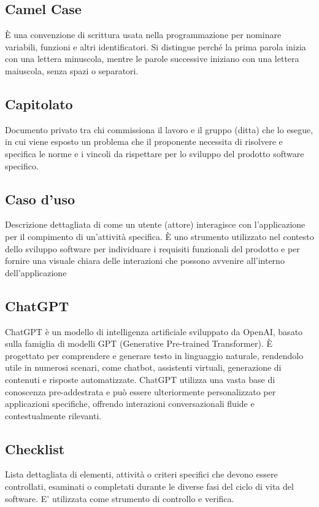 \subsection*{Camel Case}
È una convenzione di scrittura usata nella programmazione per nominare variabili, funzioni e altri identificatori. 
Si distingue perché la prima parola inizia con una lettera minuscola, mentre le parole successive iniziano con una lettera maiuscola, senza spazi o separatori.

\hypertarget{sec:capitolato}{}
\subsection*{Capitolato}
Documento privato tra chi commissiona il lavoro e il gruppo (ditta) che lo esegue, in cui viene esposto un problema che il proponente necessita di risolvere 
e specifica le norme e i vincoli da rispettare per lo sviluppo del prodotto software specifico.

\hypertarget{sec:caso_uso}{}
\subsection*{Caso d'uso}
Descrizione dettagliata di come un utente (attore) interagisce con l'applicazione per il compimento di un'attività specifica. È uno strumento utilizzato nel 
contesto dello sviluppo software per individuare i requisiti funzionali del prodotto e per fornire una visuale chiara delle interazioni che possono avvenire 
all'interno dell'applicazione

\hypertarget{sec:chatgpt}{}
\subsection*{ChatGPT}
ChatGPT è un modello di intelligenza artificiale sviluppato da OpenAI, basato sulla famiglia di modelli GPT (Generative Pre-trained Transformer). 
È progettato per comprendere e generare testo in linguaggio naturale, rendendolo utile in numerosi scenari, come chatbot, assistenti virtuali, generazione 
di contenuti e risposte automatizzate. ChatGPT utilizza una vasta base di conoscenza pre-addestrata e può essere ulteriormente personalizzato per 
applicazioni specifiche, offrendo interazioni conversazionali fluide e contestualmente rilevanti.

\subsection*{Checklist}
Lista dettagliata di elementi, attività o criteri specifici che devono essere controllati, esaminati o completati durante le diverse fasi del ciclo di vita 
del software. E' utilizzata come strumento di controllo e verifica.

